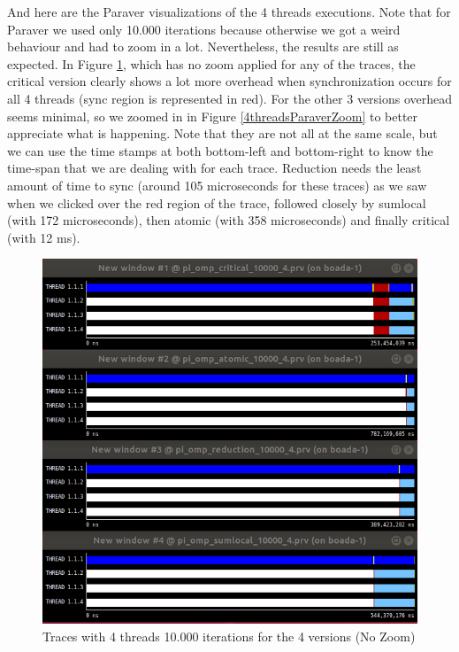 \documentclass[12]{article}
\begin{document}
And here are the Paraver visualizations of the 4 threads executions. Note that for Paraver we used only 10.000 iterations because otherwise we got a weird behaviour and had to zoom in a lot. Nevertheless, the results are still as expected. In Figure \ref{4threadsParaverNoZoom}, which has no zoom applied for any of the traces, the critical version clearly shows a lot more overhead when synchronization occurs for all 4 threads (sync region is represented in red). For the other 3 versions overhead seems minimal, so we zoomed in in Figure \ref{4threadsParaverZoom} to better appreciate what is happening. Note that they are not all at the same scale, but we can use the time stamps at both bottom-left and bottom-right to know the time-span that we are dealing with for each trace. Reduction needs the least amount of time to sync (around 105 microseconds for these traces) as we saw when we clicked over the red region of the trace, followed closely by sumlocal (with 172 microseconds), then atomic (with 358 microseconds) and finally critical (with 12 ms).

\begin{figure}[H]
\centering
\includegraphics[scale=0.85]{images/4threadsParaverNoZoom.png}
\caption{Traces with 4 threads 10.000 iterations for the 4 versions (No Zoom)}
\label{4threadsParaverNoZoom}
\end{figure}
\end{document}
